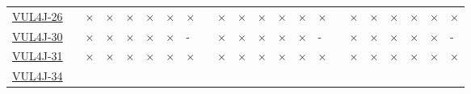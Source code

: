 \begin{table}[!htbp]
{\begin{tabular}{|l|lll|ll|ll||lll|ll|ll||lll|ll|ll|}
		\href{https://github.com/apache/struts/commit/a0fdca138feec2c2e94eb75ca1f8b76678b4d152}{VUL4J-26} & \cellcolor{green}\checkmark & \cellcolor{red}$\times$ & \cellcolor{red}$\times$ & \cellcolor{red}$\times$ & \cellcolor{red}$\times$ & \cellcolor{red}$\times$ & \cellcolor{red}$\times$  & \cellcolor{green}\checkmark & \cellcolor{red}$\times$ & \cellcolor{red}$\times$ & \cellcolor{red}$\times$ & \cellcolor{red}$\times$ & \cellcolor{red}$\times$ & \cellcolor{red}$\times$     & \cellcolor{green}\checkmark & \cellcolor{red}$\times$ & \cellcolor{red}$\times$ & \cellcolor{red}$\times$ & \cellcolor{red}$\times$ & \cellcolor{red}$\times$ & \cellcolor{red}$\times$\\ 
		\href{https://github.com/apache/struts/commit/554b9dddb0fbd1e581ef577dd62a7c22955ad0f6}{VUL4J-30} & \cellcolor{green}\checkmark & \cellcolor{red}$\times$ & \cellcolor{red}$\times$ & \cellcolor{red}$\times$ & \cellcolor{red}$\times$ & \cellcolor{red}$\times$ & \cellcolor{lightgray}-  & \cellcolor{green}\checkmark & \cellcolor{red}$\times$ & \cellcolor{red}$\times$ & \cellcolor{red}$\times$ & \cellcolor{red}$\times$ & \cellcolor{red}$\times$ & \cellcolor{lightgray}-     & \cellcolor{green}\checkmark & \cellcolor{red}$\times$ & \cellcolor{red}$\times$ & \cellcolor{red}$\times$ & \cellcolor{red}$\times$ & \cellcolor{red}$\times$ & \cellcolor{lightgray}-\\ 
		\href{https://github.com/apache/struts/commit/237432512df0e27013f7c7b9ab59fdce44ca34a5}{VUL4J-31} & \cellcolor{green}\checkmark & \cellcolor{red}$\times$ & \cellcolor{red}$\times$ & \cellcolor{red}$\times$ & \cellcolor{red}$\times$ & \cellcolor{red}$\times$ & \cellcolor{red}$\times$  & \cellcolor{green}\checkmark & \cellcolor{red}$\times$ & \cellcolor{red}$\times$ & \cellcolor{red}$\times$ & \cellcolor{red}$\times$ & \cellcolor{red}$\times$ & \cellcolor{red}$\times$     & \cellcolor{green}\checkmark & \cellcolor{red}$\times$ & \cellcolor{red}$\times$ & \cellcolor{red}$\times$ & \cellcolor{red}$\times$ & \cellcolor{red}$\times$ & \cellcolor{red}$\times$\\ 
		\href{https://github.com/apache/struts/commit/fc2179cf1ac9fbfb61e3430fa88b641d87253327}{VUL4J-34} & \cellcolor{green}\checkmark & \cellcolor{green}\checkmark & \cellcolor{green}\checkmark & \cellcolor{green}\checkmark & \cellcolor{green}\checkmark & \cellcolor{green}\checkmark & \cellcolor{green}\checkmark  & \cellcolor{green}\checkmark & \cellcolor{green}\checkmark & \cellcolor{green}\checkmark & \cellcolor{green}\checkmark & \cellcolor{green}\checkmark & \cellcolor{green}\checkmark & \cellcolor{green}\checkmark     & \cellcolor{green}\checkmark & \cellcolor{green}\checkmark & \cellcolor{green}\checkmark & \cellcolor{green}\checkmark & \cellcolor{green}\checkmark & \cellcolor{green}\checkmark & \cellcolor{green}\checkmark\\ 

\end{tabular}}
\end{table}

